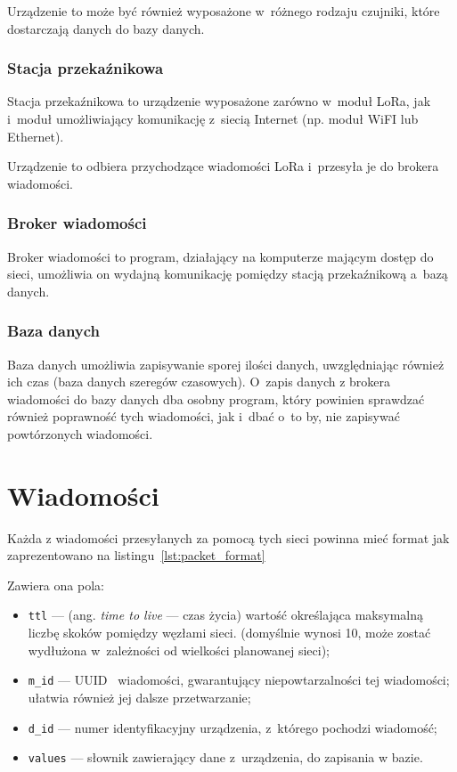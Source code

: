 Urządzenie to może być również wyposażone w~różnego rodzaju czujniki, które dostarczają danych do bazy danych.

\subsubsection{Stacja przekaźnikowa}
Stacja przekaźnikowa to urządzenie wyposażone zarówno w~moduł LoRa, jak i~moduł umożliwiający komunikację z~siecią Internet (np. moduł WiFI lub Ethernet).

Urządzenie to odbiera przychodzące wiadomości LoRa i~przesyła je do brokera wiadomości.

\subsubsection{Broker wiadomości}
Broker wiadomości to program, działający na komputerze mającym dostęp do sieci, umożliwia on wydajną komunikację pomiędzy stacją przekaźnikową a~bazą danych.

\subsubsection{Baza danych}
Baza danych umożliwia zapisywanie sporej ilości danych, uwzględniając również ich czas (baza danych szeregów czasowych).
O~zapis danych z brokera wiadomości do bazy danych dba osobny program, który powinien sprawdzać również poprawność tych wiadomości, jak i~dbać o~to by, nie zapisywać powtórzonych wiadomości.

\section{Wiadomości}
Każda z wiadomości przesyłanych za pomocą tych sieci powinna mieć format jak zaprezentowano na listingu~\ref{lst:packet_format}

Zawiera ona pola:
\begin{itemize}
    \item \texttt{ttl} — (ang. \emph{time to live} — czas życia) wartość określająca maksymalną liczbę skoków pomiędzy węzłami sieci. (domyślnie wynosi 10, może zostać wydłużona w~zależności od wielkości planowanej sieci);
    \item \texttt{m\_id} — UUID~\cite{RFC:uuid} wiadomości, gwarantujący niepowtarzalności tej wiadomości; ułatwia również jej dalsze przetwarzanie;
    \item \texttt{d\_id} — numer identyfikacyjny urządzenia, z~którego pochodzi wiadomość;
    \item \texttt{values} — słownik zawierający dane z~urządzenia, do zapisania w bazie.
\end{itemize}

